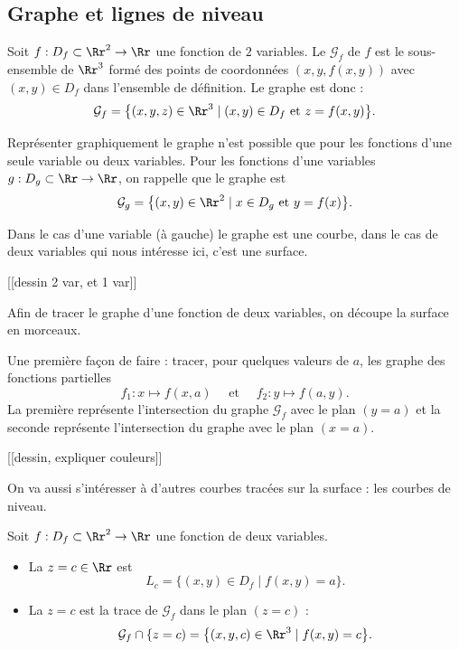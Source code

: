 \documentclass[12pt, class=report,crop=false]{standalone}
\begin{document}
\subsection{Graphe et lignes de niveau}



\begin{definition}
Soit $f : D_f \subset \Rr^2 \to \Rr$ une fonction de $2$ variables. 
Le  $\mathcal{G}_f$ de $f$ est le sous-ensemble de $\Rr^3$ formé des points de coordonnées $(x,y,f(x,y))$ avec $(x,y)\in D_f$ dans l'ensemble de définition. Le graphe est donc :
$$\mathcal{G}_f= \big\{ (x,y,z)\in \Rr^3 \mid (x,y)\in D_f \text{ et } z=f(x,y)\big\}.$$
\end{definition}

Représenter graphiquement le graphe n'est possible que pour les fonctions d'une seule variable ou deux variables. 
Pour les fonctions d'une variables $g: D_g \subset \Rr \to \Rr$, on rappelle que le graphe est 
$$\mathcal{G}_g= \big\{ (x,y)\in \Rr^2 \mid x \in D_g \text{ et } y=f(x)\big\}.$$


Dans le cas d'une variable (à gauche) le graphe est une courbe, dans le cas de deux variables qui nous intéresse ici, c'est une surface.

[[dessin 2 var, et 1 var]]

Afin de tracer le graphe d'une fonction de deux variables, on découpe la surface en morceaux.


\bigskip


Une première façon de faire : tracer, pour quelques valeurs de $a$, les graphe des fonctions partielles
$$f_1:x\mapsto f(x,a) \quad \text{ et } \quad f_2:y\mapsto f(a,y).$$
La première représente l'intersection du graphe $\mathcal{G}_f$ avec le plan $(y=a)$ et la seconde représente l'intersection du graphe avec le plan $(x=a)$.

[[dessin, expliquer couleurs]]

\bigskip


On va aussi s'intéresser à d'autres courbes tracées sur la surface : les courbes de niveau.


\begin{definition}

Soit $f : D_f \subset \Rr^2 \to \Rr$ une fonction de deux variables. 
\begin{itemize}
  \item La  
$z=c\in \Rr$ est 
$$L_c =\big\{(x,y)\in D_f \mid f(x,y)=a \big\}.$$
  \item La  $z=c$ est la trace de $\mathcal{G}_f$ dans le plan $(z=c)$ : 
$$\mathcal{G}_f \cap \{z=c) = \big\{ (x,y,c)\in \Rr^3 \mid f(x,y)=c \big\}.$$
\end{itemize}
\end{definition}
\end{document}
